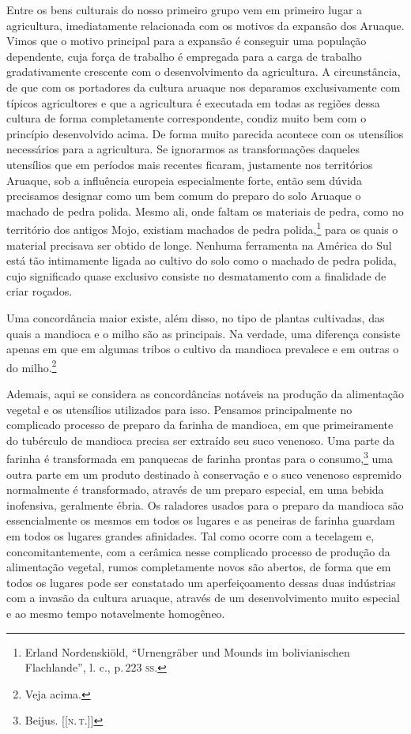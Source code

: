 Entre os bens culturais do nosso primeiro grupo vem em primeiro lugar a
agricultura, imediatamente relacionada com os motivos da expansão dos
Aruaque. Vimos que o motivo principal para a expansão é conseguir uma
população dependente, cuja força de trabalho é empregada para a carga de
trabalho gradativamente crescente com o desenvolvimento da agricultura.
A circunstância, de que com os portadores da cultura aruaque nos
deparamos exclusivamente com típicos agricultores e que a agricultura é
executada em todas as regiões dessa cultura de forma completamente
correspondente, condiz muito bem com o princípio desenvolvido acima. De
forma muito parecida acontece com os utensílios necessários para a
agricultura. Se ignorarmos as transformações daqueles utensílios que em
períodos mais recentes ficaram, justamente nos territórios Aruaque, sob
a influência europeia especialmente forte, então sem dúvida precisamos
designar como um bem comum do preparo do solo Aruaque o machado de pedra
polida. Mesmo ali, onde faltam os materiais de pedra, como no território
dos antigos Mojo, existiam machados de pedra polida,\footnote{Erland
  Nordenskiöld, ``Urnengräber und Mounds im bolivianischen Flachlande'',
  l. c., p.\,223 \textsc{ss}.} para os quais o material precisava ser obtido de
longe. Nenhuma ferramenta na América do Sul está tão intimamente ligada
ao cultivo do solo como o machado de pedra polida, cujo significado
quase exclusivo consiste no desmatamento com a finalidade de criar
roçados.

Uma concordância maior existe, além disso, no tipo de plantas
cultivadas, das quais a mandioca e o milho são as principais. Na
verdade, uma diferença consiste apenas em que em algumas tribos o
cultivo da mandioca prevalece e em outras o do milho.\footnote{Veja
  acima.}

Ademais, aqui se considera as concordâncias notáveis na produção da
alimentação vegetal e os utensílios utilizados para isso. Pensamos
principalmente no complicado processo de preparo da farinha de
mandioca, em que primeiramente do tubérculo de mandioca precisa ser
extraído seu suco venenoso. Uma parte da farinha é transformada em
panquecas de farinha prontas para o consumo,\footnote{Beijus. {[}{[}\textsc{n.\,t.}{]}{]}} uma
outra parte em um produto destinado à conservação e o suco venenoso
espremido normalmente é transformado, através de um preparo especial, em
uma bebida inofensiva, geralmente ébria. Os raladores usados para o
preparo da mandioca são essencialmente os mesmos em todos os lugares e
as peneiras de farinha guardam em todos os lugares grandes afinidades.
Tal como ocorre com a tecelagem e, concomitantemente, com a cerâmica
nesse complicado processo de produção da alimentação vegetal, rumos
completamente novos são abertos, de forma que em todos os lugares pode
ser constatado um aperfeiçoamento dessas duas indústrias com a invasão
da cultura aruaque, através de um desenvolvimento muito especial e ao
mesmo tempo notavelmente homogêneo.

